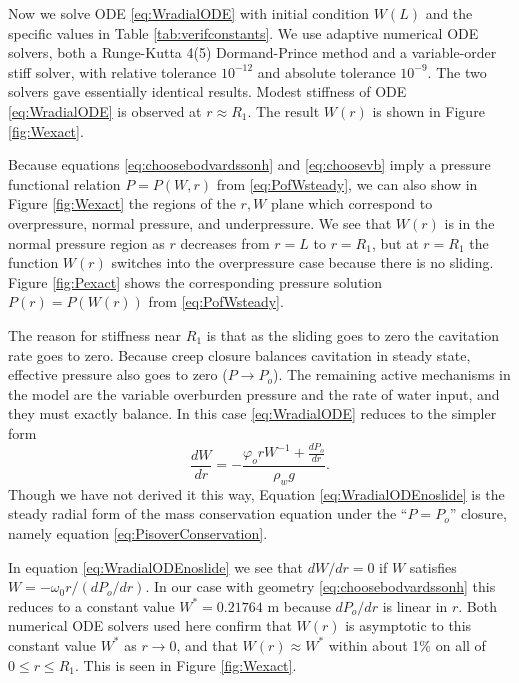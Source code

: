 \documentclass[gmd]{copernicus}   %
\begin{document}
Now we solve ODE \eqref{eq:WradialODE} with initial condition $W(L)$ and the specific values in Table \ref{tab:verifconstants}.  We use adaptive numerical ODE solvers, both a Runge-Kutta 4(5) Dormand-Prince method and a variable-order stiff solver, with relative tolerance $10^{-12}$ and absolute tolerance $10^{-9}$.  The two solvers gave essentially identical results.  Modest stiffness \citep{AscherPetzold} of ODE \eqref{eq:WradialODE} is observed at $r\approx R_1$.  The result $W(r)$ is shown in Figure \ref{fig:Wexact}.

Because equations \eqref{eq:choosebodvardssonh} and \eqref{eq:choosevb} imply a pressure functional relation $P=P(W,r)$ from \eqref{eq:PofWsteady}, we can also show in Figure \ref{fig:Wexact} the regions of the $r,W$ plane which correspond to overpressure, normal pressure, and underpressure.  We see that $W(r)$ is in the normal pressure region as $r$ decreases from $r=L$ to $r=R_1$, but at $r=R_1$ the function $W(r)$ switches into the overpressure case because there is no sliding.  Figure \ref{fig:Pexact} shows the corresponding pressure solution $P(r)=P(W(r))$ from \eqref{eq:PofWsteady}.

The reason for stiffness near $R_1$ is that as the sliding goes to zero the cavitation rate goes to zero.  Because creep closure balances cavitation in steady state, effective pressure also goes to zero ($P\to P_o$).  The remaining active mechanisms in the model are the variable overburden pressure and the rate of water input, and they must exactly balance.  In this case \eqref{eq:WradialODE} reduces to the simpler form
\begin{equation}
\frac{dW}{dr} = - \frac{\varphi_o r W^{-1} + \frac{dP_o}{dr}}{\rho_w g}. \label{eq:WradialODEnoslide}
\end{equation}
Though we have not derived it this way, Equation \eqref{eq:WradialODEnoslide} is the steady radial form of the mass conservation equation under the ``$P=P_o$'' closure, namely equation \eqref{eq:PisoverConservation}.

In equation \eqref{eq:WradialODEnoslide} we see that $dW/dr=0$ if $W$ satisfies $W = - \omega_0 r / (dP_o/dr)$.  In our case with geometry \eqref{eq:choosebodvardssonh} this reduces to a constant value $W^*= 0.21764$ m because $dP_o/dr$ is linear in $r$.  Both numerical ODE solvers used here confirm that $W(r)$ is asymptotic to this constant value $W^*$ as $r\to 0$, and that $W(r)\approx W^*$ within about 1\% on all of $0\le r \le R_1$.  This is seen in Figure \ref{fig:Wexact}.
\end{document}
